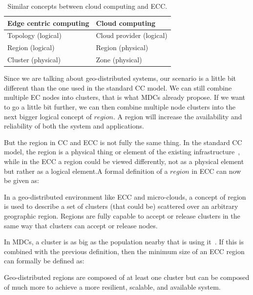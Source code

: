 \begin{table}[h!]
	\begin{center}
		\begin{tabular}{l|l}
			\textbf{Edge centric computing} & \textbf{Cloud computing}\\
			\hline
			Topology (logical) & Cloud provider (logical)\\
			Region (logical) & Region (physical)\\
			Cluster (physical) & Zone (physical)\\
		\end{tabular}
	\end{center}
	\vspace{-0.5cm}
	\caption{Similar concepts between cloud computing and ECC.}
	\label{tab:table5}
\end{table}

\noindent
Since we are talking about geo-distributed systems, our scenario is a little bit different than the one used in the standard CC model. We can still combine multiple EC nodes into clusters, that is what MDCs already propose. If we want to go a little bit further, we can then combine multiple node clusters into the next bigger logical concept of $region$. A region will increase the availability and reliability of both the system and applications. 

But the region in CC and ECC is not fully the same thing. In the standard CC model, the region is a physical thing or element of the existing infrastructure~\cite{SouzaMFAK19}, while in the ECC a region could be viewed differently, not as a physical element but rather as a logical element.A formal definition of a $region$ in ECC can now be given as:

\begin{definition}
	In a geo-distributed environment like ECC and micro-clouds, a concept of region is used to describe a set of clusters (that could be) scattered over an arbitrary geographic region. Regions are fully capable to accept or release clusters in the same way that clusters can accept or release nodes.
\end{definition}

In MDCs, a cluster is as big as the population nearby that is using it~\cite{GreenbergHMP09}. If this is combined with the previous definition, then the minimum size of an ECC region can formally be defined as:

\begin{definition}
	Geo-distributed regions are composed of at least one cluster but can be composed of much more to achieve a more resilient, scalable, and available system.
\end{definition}

